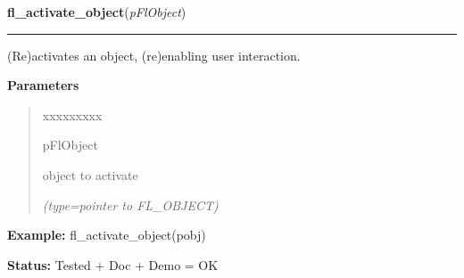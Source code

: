 \hspace{.8\funcindent}\begin{boxedminipage}{\funcwidth}

    \raggedright \textbf{fl\_activate\_object}(\textit{pFlObject})

    \vspace{-1.5ex}

    \rule{\textwidth}{0.5\fboxrule}
\setlength{\parskip}{2ex}
    (Re)activates an object, (re)enabling user interaction.

\setlength{\parskip}{1ex}
      \textbf{Parameters}
      \vspace{-1ex}

      \begin{quote}
        \begin{Ventry}{xxxxxxxxx}

          \item[pFlObject]

          object to activate

            {\it (type=pointer to FL\_OBJECT)}

        \end{Ventry}

      \end{quote}

\textbf{Example:} fl\_activate\_object(pobj)



\textbf{Status:} Tested + Doc + Demo = OK



    \end{boxedminipage}

    \label{xformslib:flbasic:fl_deactivate_object}

    \vspace{0.5ex}


